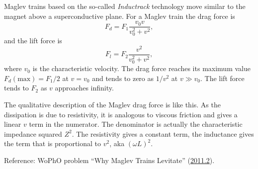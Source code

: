 \documentclass[14pt]{article}
\begin{document}
Maglev trains based on the so-called \textit{Inductrack} technology move similar to the magnet above a superconductive plane. For a Maglev train the drag force is
$$
  F_d=F_1 \frac{v_0 v}{v_0^2+v^2},
$$
and the lift force is
$$
  F_l=F_2\frac{v^2}{v_0^2+v^2},
$$
where $v_0$ is the characteristic velocity. The drag force reaches its maximum value $F_d (\text{max})=F_1/2$ at $v=v_0$ and tends to zero as $1/v^2$ at $v\gg v_0$. The lift force tends to $F_2$ as $v$ approaches infinity.

The qualitative description of the Maglev drag force is like this. As the dissipation is due to resistivity, it is analogous to viscous friction and gives a linear $v$ term in the numerator. The denominator is actually the characteristic impedance squared $Z^2$. The resistivity gives a constant term, the inductance gives the term that is proportional to $v^2$, aka $(\omega L)^2$.

Reference: WoPhO problem ``Why Maglev Trains Levitate'' (\href{http://www.wopho.org/file/upload/Theoretical2problem.pdf}{2011.2}).
\end{document}
